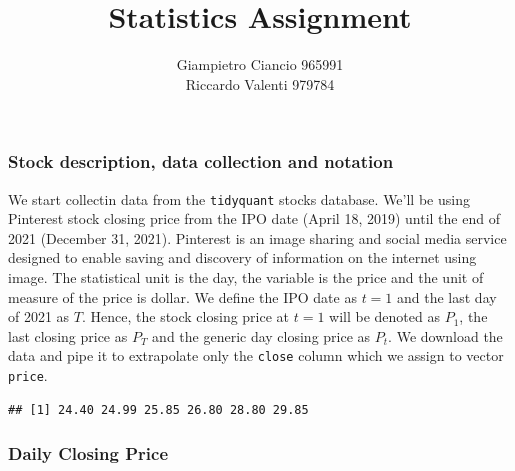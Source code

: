 \documentclass[
]{article}
\title{Statistics Assignment}
\author{Giampietro Ciancio 965991\\
Riccardo Valenti 979784}
\date{}
\newenvironment{Shaded}{\begin{snugshade}}{\end{snugshade}}
\newcommand{\AttributeTok}[1]{\textcolor[rgb]{0.77,0.63,0.00}{#1}}
\newcommand{\FunctionTok}[1]{\textcolor[rgb]{0.00,0.00,0.00}{#1}}
\newcommand{\NormalTok}[1]{#1}
\newcommand{\OtherTok}[1]{\textcolor[rgb]{0.56,0.35,0.01}{#1}}
\newcommand{\SpecialCharTok}[1]{\textcolor[rgb]{0.00,0.00,0.00}{#1}}
\newcommand{\StringTok}[1]{\textcolor[rgb]{0.31,0.60,0.02}{#1}}
\begin{document}
\maketitle

\hypertarget{stock-description-data-collection-and-notation}{%
\subsubsection{Stock description, data collection and
notation}\label{stock-description-data-collection-and-notation}}

We start collectin data from the \texttt{tidyquant} stocks database.
We'll be using Pinterest stock closing price from the IPO date (April
18, 2019) until the end of 2021 (December 31, 2021). Pinterest is an
image sharing and social media service designed to enable saving and
discovery of information on the internet using image. The statistical
unit is the day, the variable is the price and the unit of measure of
the price is dollar. We define the IPO date as \(t=1\) and the last day
of 2021 as \(T\). Hence, the stock closing price at \(t=1\) will be
denoted as \(P_1\), the last closing price as \(P_T\) and the generic
day closing price as \(P_t\). We download the data and pipe it to
extrapolate only the \texttt{close} column which we assign to vector
\texttt{price}.

\begin{Shaded}
\end{Shaded}

\begin{verbatim}
## [1] 24.40 24.99 25.85 26.80 28.80 29.85
\end{verbatim}

\hypertarget{daily-closing-price}{%
\subsubsection{Daily Closing Price}\label{daily-closing-price}}
\end{document}
